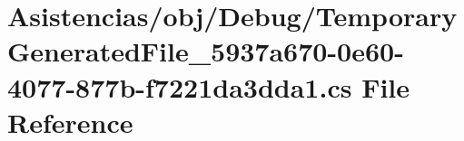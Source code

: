 \hypertarget{_asistencias_2obj_2_debug_2_temporary_generated_file__5937a670-0e60-4077-877b-f7221da3dda1_8cs}{\section{Asistencias/obj/\-Debug/\-Temporary\-Generated\-File\-\_\-5937a670-\/0e60-\/4077-\/877b-\/f7221da3dda1.cs File Reference}
\label{_asistencias_2obj_2_debug_2_temporary_generated_file__5937a670-0e60-4077-877b-f7221da3dda1_8cs}
}
